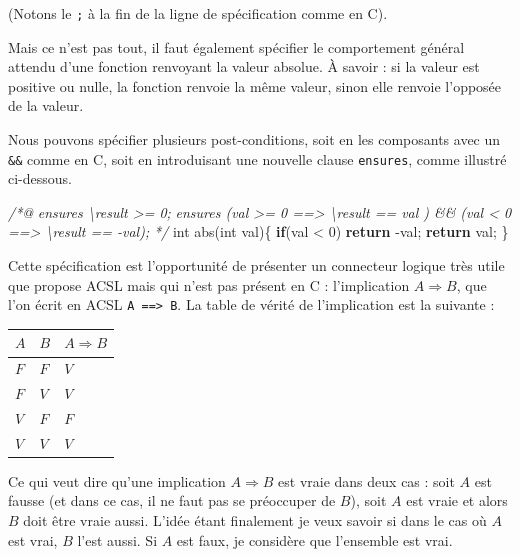 \documentclass[12pt,francais,]{scrbook}
\newenvironment{Shaded}{}{}
\newcommand{\KeywordTok}[1]{\textcolor[rgb]{0.00,0.44,0.13}{\textbf{{#1}}}}
\newcommand{\DataTypeTok}[1]{\textcolor[rgb]{0.56,0.13,0.00}{{#1}}}
\newcommand{\DecValTok}[1]{\textcolor[rgb]{0.25,0.63,0.44}{{#1}}}
\newcommand{\CommentTok}[1]{\textcolor[rgb]{0.38,0.63,0.69}{\textit{{#1}}}}
\newcommand{\NormalTok}[1]{{#1}}
\begin{document}
(Notons le \texttt{;} à la fin de la ligne de spécification comme en C).

Mais ce n'est pas tout, il faut également spécifier le comportement
général attendu d'une fonction renvoyant la valeur absolue. À savoir :
si la valeur est positive ou nulle, la fonction renvoie la même valeur,
sinon elle renvoie l'opposée de la valeur.

Nous pouvons spécifier plusieurs post-conditions, soit en les composants
avec un \texttt{\&\&} comme en C, soit en introduisant une nouvelle
clause \texttt{ensures}, comme illustré ci-dessous.

\begin{footnotesize}\begin{Shaded}
\begin{Highlighting}[]
\CommentTok{/*@}
\CommentTok{  ensures \textbackslash{}result >= 0;}
\CommentTok{  ensures (val >= 0 ==> \textbackslash{}result == val ) && }
\CommentTok{          (val <  0 ==> \textbackslash{}result == -val);}
\CommentTok{*/}
\DataTypeTok{int} \NormalTok{abs(}\DataTypeTok{int} \NormalTok{val)\{}
  \KeywordTok{if}\NormalTok{(val < }\DecValTok{0}\NormalTok{) }\KeywordTok{return} \NormalTok{-val;}
  \KeywordTok{return} \NormalTok{val;}
\NormalTok{\}}
\end{Highlighting}
\end{Shaded}\end{footnotesize}

Cette spécification est l'opportunité de présenter un connecteur logique
très utile que propose ACSL mais qui n'est pas présent en C :
l'implication \(A \Rightarrow B\), que l'on écrit en ACSL
\texttt{A\ ==\textgreater{}\ B}. La table de vérité de l'implication est
la suivante :

\begin{longtable}[]{@{}lll@{}}
\toprule
\(A\) & \(B\) & \(A \Rightarrow B\)\tabularnewline
\midrule
\endhead
\(F\) & \(F\) & \(V\)\tabularnewline
\(F\) & \(V\) & \(V\)\tabularnewline
\(V\) & \(F\) & \(F\)\tabularnewline
\(V\) & \(V\) & \(V\)\tabularnewline
\bottomrule
\end{longtable}

Ce qui veut dire qu'une implication \(A \Rightarrow B\) est vraie dans
deux cas : soit \(A\) est fausse (et dans ce cas, il ne faut pas se
préoccuper de \(B\)), soit \(A\) est vraie et alors \(B\) doit être
vraie aussi. L'idée étant finalement \og{}je veux savoir si dans le cas où
\(A\) est vrai, \(B\) l'est aussi. Si \(A\) est faux, je considère que
l'ensemble est vrai\fg{}.
\end{document}
